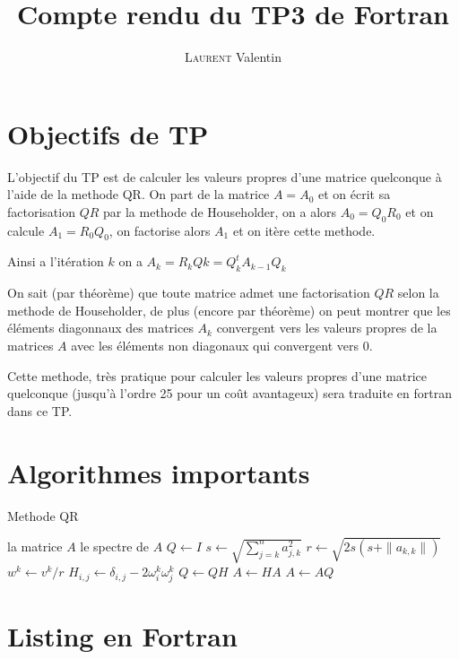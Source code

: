 \documentclass{report}
\title{Compte rendu du TP3 de Fortran}
\author{\textsc{Laurent} Valentin}
\begin{document}
\maketitle

\tableofcontents

\setcounter{chapter}{1}
\newpage
\section{Objectifs de TP}\label{objectifs}
L'objectif du TP est de calculer les valeurs propres d'une matrice quelconque à l'aide de la methode QR.
On part de la matrice $A = A_{0}$ et on écrit sa factorisation $QR$ par la methode de Householder, on a alors
$A_{0} = Q_{0} R_{0}$ et on calcule $A_{1} = R_{0} Q_{0}$, on factorise alors $A_{1}$ et on itère cette methode.

Ainsi a l'itération $k$ on a $A_{k} = R_{k}Q{k} = Q_{k}^{t}A_{k-1}Q_{k}$

On sait (par théorème) que toute matrice admet une factorisation $QR$ selon la methode de Householder, de plus
(encore par théorème) on peut montrer que les éléments diagonnaux des matrices $A_{k}$ convergent vers les valeurs
propres de la matrices $A$ avec les éléments non diagonaux qui convergent vers $0$.

Cette methode, très pratique pour calculer les valeurs propres d'une matrice quelconque (jusqu'à l'ordre 25 pour un coût
avantageux) sera traduite en fortran dans ce TP.
\section{Algorithmes importants}\label{algo}

\begin{algorithm}
\caption{Methode QR}
\begin{algorithmic} 
\REQUIRE la matrice $A$
\ENSURE le spectre de $A$
\STATE $Q \leftarrow I $
\STATE $s \leftarrow \sqrt{\displaystyle\sum^{n}_{j=k}{a_{j,k}^2}}$
\STATE $r \leftarrow \sqrt{2s(s + \| a_{k,k} \|)}$
\STATE $w^{k} \leftarrow v^{k}/{r}$
\STATE $H_{i,j} \leftarrow \delta_{i,j} - 2 \omega_{i}^{k} \omega_{j}^{k}$
\STATE $Q \leftarrow Q H$
\STATE $A \leftarrow H A$
\ENDFOR
\STATE $A \leftarrow A Q$
\ENDWHILE
\end{algorithmic}
\end{algorithm}

\newpage
\section{Listing en Fortran}\label{fortran}
\end{document}
